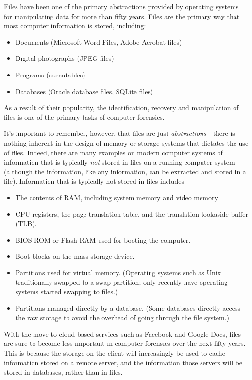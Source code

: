 \documentclass[11pt,letter]{article}
\begin{document}
Files have been one of the primary abstractions provided by operating
systems for manipulating data for more than fifty years. Files are
the primary way that most computer information is stored, including:

\begin{itemize}
\item Documents (\eg Microsoft Word Files, Adobe Acrobat files)
\item Digital photographs (\eg JPEG files)
\item Programs (\eg executables)
\item Databases (\eg Oracle database files, SQLite files)
\end{itemize}

As a result of their popularity, the identification, recovery and
manipulation of files is one of the primary tasks of computer
forensics. 

It's important to remember, however, that files are just
\emph{abstractions}---there is nothing inherent in the design of
memory or storage systems that dictates the use of files. Indeed,
there are many examples on modern computer systems of information that
is typically \emph{not} stored in files on a running computer system
(although the information, like any information, can be extracted and
stored in a file). Information that is typically not stored in files includes:

\begin{itemize}
\item The contents of RAM, including system memory and video memory.
\item CPU registers, the page translation table, and the translation
  lookaside buffer (TLB).
\item BIOS ROM or Flash RAM used for booting the computer.
\item Boot blocks on the mass storage device.
\item Partitions used for virtual memory. (Operating systems such
  as Unix traditionally swapped to a swap partition; only recently
  have operating systems started swapping to files.)
\item Partitions managed directly by a database. (Some databases
  directly access the raw storage to avoid the overhead of going
  through the file system.)
\end{itemize}

With the move to cloud-based services such as Facebook and Google
Docs, files are sure to become less important in computer forensics
over the next fifty years. This is because the storage on the client
will increasingly be used to cache information stored on a remote
server, and the information those servers will be stored in databases,
rather than in files.
\end{document}
